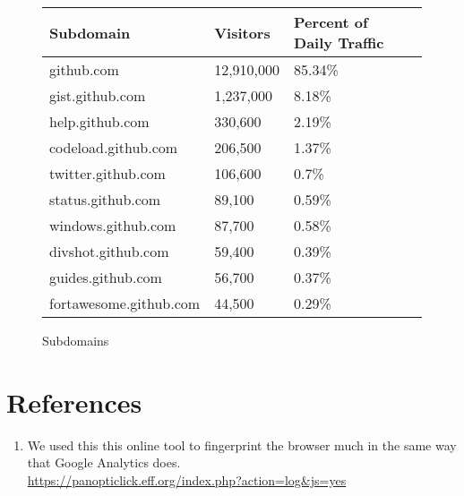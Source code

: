 \documentclass[12pt]{article}
\begin{document}
\begin{figure}
\begin{table}
\begin{tabular}{| l | l | l | l | l | }
\hline

Subdomain & Visitors & Percent of Daily Traffic \\ \hline
github.com & 12,910,000 & 85.34\% \\ \hline
gist.github.com & 1,237,000 & 8.18\%  \\ \hline
help.github.com & 330,600 & 2.19\%  \\ \hline
codeload.github.com & 206,500 & 1.37\%  \\ \hline
twitter.github.com & 106,600 & 0.7\%  \\ \hline
status.github.com & 89,100 & 0.59\%  \\ \hline
windows.github.com & 87,700 & 0.58\%  \\ \hline
divshot.github.com & 59,400 & 0.39\%  \\ \hline
guides.github.com & 56,700 & 0.37\%  \\ \hline
fortawesome.github.com & 44,500 & 0.29\%  \\ \hline
\end{tabular}
\end{table}
\caption{Subdomains\newline}
\label{fig:mig_over}
\end{figure}






\section{References}\label{references}
\begin{enumerate}
\item We used this this online tool to fingerprint the browser much in the same way that Google Analytics does.\\ \url{https://panopticlick.eff.org/index.php?action=log&js=yes}
\end{enumerate}
\end{document}
